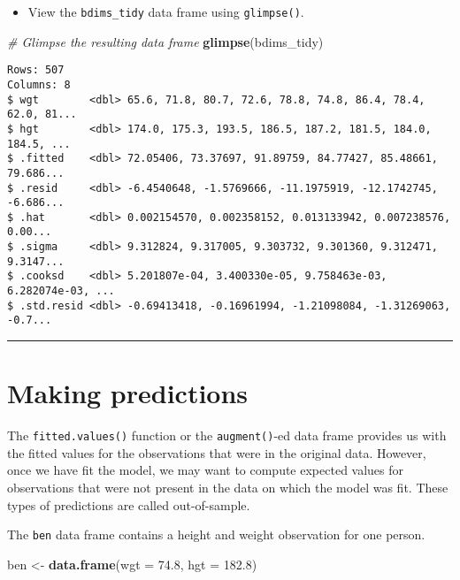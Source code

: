 \documentclass[
]{book}
\newenvironment{Shaded}{\begin{snugshade}}{\end{snugshade}}
\newcommand{\CommentTok}[1]{\textcolor[rgb]{0.56,0.35,0.01}{\textit{#1}}}
\newcommand{\DataTypeTok}[1]{\textcolor[rgb]{0.13,0.29,0.53}{#1}}
\newcommand{\FloatTok}[1]{\textcolor[rgb]{0.00,0.00,0.81}{#1}}
\newcommand{\KeywordTok}[1]{\textcolor[rgb]{0.13,0.29,0.53}{\textbf{#1}}}
\newcommand{\NormalTok}[1]{#1}
\newcommand{\StringTok}[1]{\textcolor[rgb]{0.31,0.60,0.02}{#1}}
\providecommand{\tightlist}{%
  \setlength{\itemsep}{0pt}\setlength{\parskip}{0pt}}
\begin{document}
\begin{itemize}
\tightlist
\item
  View the \texttt{bdims\_tidy} data frame using \texttt{glimpse()}.
\end{itemize}

\begin{Shaded}
\begin{Highlighting}[]
\CommentTok{# Glimpse the resulting data frame}
\KeywordTok{glimpse}\NormalTok{(bdims_tidy)}
\end{Highlighting}
\end{Shaded}

\begin{verbatim}
Rows: 507
Columns: 8
$ wgt        <dbl> 65.6, 71.8, 80.7, 72.6, 78.8, 74.8, 86.4, 78.4, 62.0, 81...
$ hgt        <dbl> 174.0, 175.3, 193.5, 186.5, 187.2, 181.5, 184.0, 184.5, ...
$ .fitted    <dbl> 72.05406, 73.37697, 91.89759, 84.77427, 85.48661, 79.686...
$ .resid     <dbl> -6.4540648, -1.5769666, -11.1975919, -12.1742745, -6.686...
$ .hat       <dbl> 0.002154570, 0.002358152, 0.013133942, 0.007238576, 0.00...
$ .sigma     <dbl> 9.312824, 9.317005, 9.303732, 9.301360, 9.312471, 9.3147...
$ .cooksd    <dbl> 5.201807e-04, 3.400330e-05, 9.758463e-03, 6.282074e-03, ...
$ .std.resid <dbl> -0.69413418, -0.16961994, -1.21098084, -1.31269063, -0.7...
\end{verbatim}

\begin{center}\rule{0.5\linewidth}{0.5pt}\end{center}

\hypertarget{making-predictions}{%
\section{Making predictions}\label{making-predictions}}

The \texttt{fitted.values()} function or the \texttt{augment()}-ed data frame provides us with the fitted values for the observations that were in the original data. However, once we have fit the model, we may want to compute expected values for observations that were not present in the data on which the model was fit. These types of predictions are called out-of-sample.

The \texttt{ben} data frame contains a height and weight observation for one person.

\begin{Shaded}
\begin{Highlighting}[]
\NormalTok{ben <-}\StringTok{ }\KeywordTok{data.frame}\NormalTok{(}\DataTypeTok{wgt =} \FloatTok{74.8}\NormalTok{, }\DataTypeTok{hgt =} \FloatTok{182.8}\NormalTok{)}
\end{Highlighting}
\end{Shaded}
\end{document}
